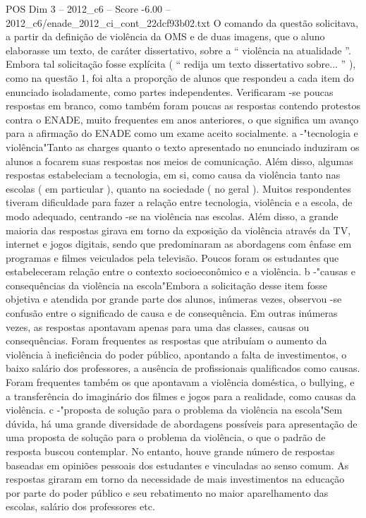 \begin{textsample}{POS Dim 3 – 2012\_c6 – Score -6.00 – 2012\_c6/enade\_2012\_ci\_cont\_22dcf93b02.txt}
O comando da questão solicitava, a partir da definição de violência da OMS e de duas imagens, que o aluno elaborasse um texto, de caráter dissertativo, sobre a “ violência na atualidade ”.
Embora tal solicitação fosse explícita ( “ redija um texto dissertativo sobre... ” ), como na questão 1, foi alta a proporção de alunos que respondeu a cada item do enunciado isoladamente, como partes independentes.
Verificaram -se poucas respostas em branco, como também foram poucas as respostas contendo protestos contra o ENADE, muito frequentes em anos anteriores, o que significa um avanço para a afirmação do ENADE como um exame aceito socialmente. a -"tecnologia e violência"Tanto as charges quanto o texto apresentado no enunciado induziram os alunos a focarem suas respostas nos meios de comunicação.
Além disso, algumas respostas estabeleciam a tecnologia, em si, como causa da violência tanto nas escolas ( em particular ), quanto na sociedade ( no geral ).
Muitos respondentes tiveram dificuldade para fazer a relação entre tecnologia, violência e a escola, de modo adequado, centrando -se na violência nas escolas.
Além disso, a grande maioria das respostas girava em torno da exposição da violência através da TV, internet e jogos digitais, sendo que predominaram as abordagens com ênfase em programas e filmes veiculados pela televisão.
Poucos foram os estudantes que estabeleceram relação entre o contexto socioeconômico e a violência. b -"causas e consequências da violência na escola"Embora a solicitação desse item fosse objetiva e atendida por grande parte dos alunos, inúmeras vezes, observou -se confusão entre o significado de causa e de consequência.
Em outras inúmeras vezes, as respostas apontavam apenas para uma das classes, causas ou consequências.
Foram frequentes as respostas que atribuíam o aumento da violência à ineficiência do poder público, apontando a falta de investimentos, o baixo salário dos professores, a ausência de profissionais qualificados como causas.
Foram frequentes também os que apontavam a violência doméstica, o bullying, e a transferência do imaginário dos filmes e jogos para a realidade, como causas da violência. c -"proposta de solução para o problema da violência na escola"Sem dúvida, há uma grande diversidade de abordagens possíveis para apresentação de uma proposta de solução para o problema da violência, o que o padrão de resposta buscou contemplar.
No entanto, houve grande número de respostas baseadas em opiniões pessoais dos estudantes e vinculadas ao senso comum.
As respostas giraram em torno da necessidade de mais investimentos na educação por parte do poder público e seu rebatimento no maior aparelhamento das escolas, salário dos professores etc.

\end{textsample}
